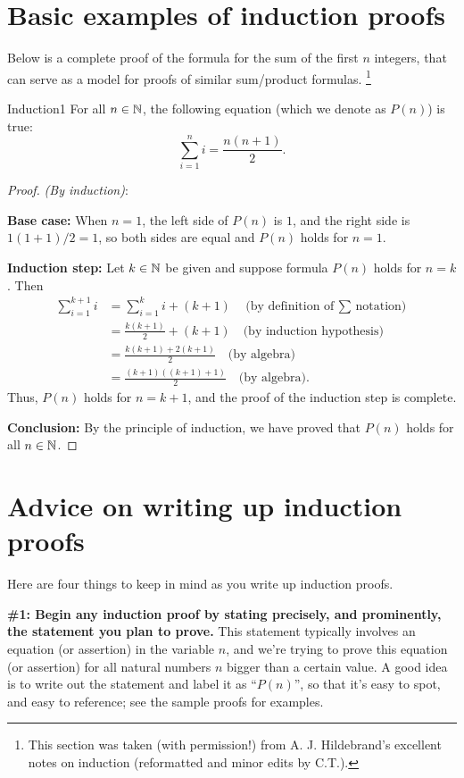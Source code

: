 

\section{ Basic examples of induction proofs}\label{sec:basic_induction}

Below is a complete proof of the
formula for the sum of the first $n$ integers, that can serve as a model
for proofs of similar sum/product formulas. \footnote{This section was taken (with permission!) from A. J. Hildebrand's excellent notes on induction (reformatted and minor edits  by C.T.).}

\begin{prop}{Induction1} For all $n\in\mathbb{N}$, the following equation (which we denote as $P(n)$)  is true:
\[
\sum_{i=1}^n i=\frac{n(n+1)}{2}.
\tag{$P(n)$}
\]
\end{prop}
\begin{proof} \emph{(By induction)}:

\noindent
\textbf{Base case:} When $n=1$, the left side of $P(n)$ is $1$, and the
right side is $1(1+1)/2=1$, so both sides are equal and $P(n)$ holds  
for $n=1$.

\noindent
\textbf{Induction step:} Let $k\in\mathbb{N}$ be given and suppose 
formula $P(n)$ holds for $n=k$. Then
\begin{align*}
\sum_{i=1}^{k+1}i&=\sum_{i=1}^k i + (k+1)\quad\text{(by 
definition of $\sum$ notation)}
\\
&=\frac{k(k+1)}{2}+(k+1)\quad \text{(by induction hypothesis)}
\\
&=\frac{k(k+1)+2(k+1)}{2}\quad \text{(by algebra)}
\\
&=\frac{(k+1)((k+1)+1)}{2}\quad \text{(by algebra)}.
\end{align*}
Thus, $P(n)$ holds for $n=k+1$, and the proof of the induction step is complete. 

\noindent
\textbf{Conclusion:} By the principle of induction, 
we have proved that $P(n)$ holds for all $n\in\mathbb{N}$.  
\end{proof}


\section{Advice on writing up induction proofs}
Here are four things to keep in mind as you write up induction proofs.

\noindent
 \textbf{\#1: Begin any induction proof by stating precisely, 
and prominently, the
statement  you plan to prove.} 
This statement typically involves an equation (or assertion) in the variable $n$, and we're trying to prove this equation (or assertion) for all natural numbers $n$ bigger than a certain value.  A good idea is to write out the statement and label it as ``$P(n)$'', so that it's easy to spot, and easy to reference; see the sample proofs for
examples.


